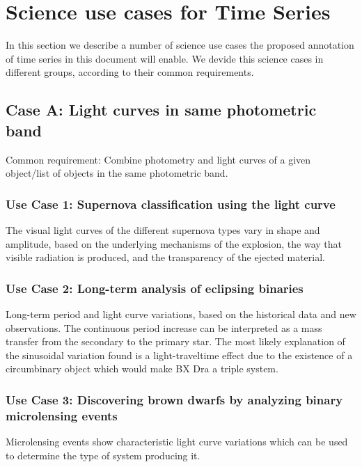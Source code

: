 \documentclass[11pt,a4paper]{ivoa}
\begin{document}
\section{Science use cases for Time Series}
In this section we describe a number of science use cases the proposed annotation of time series in this document will enable. We devide this science cases in different groups, according to their common requirements. 
\subsection{Case A: Light curves in same photometric band}
Common requirement: Combine photometry and light curves of a given object/list of objects in the same photometric band. 

\subsubsection{Use Case 1: Supernova classification using the light curve}
The visual light curves of the different supernova types vary in shape and amplitude, based on the underlying mechanisms of the explosion, the way that visible radiation is produced, and the transparency of the ejected material.
\subsubsection{Use Case 2: Long-term analysis of eclipsing binaries}
Long-term period and light curve variations, based on the historical data and new observations. The continuous period increase can be interpreted as a mass transfer from the secondary to the primary star. The most likely explanation of the sinusoidal variation found is a light-traveltime effect due to the existence of a circumbinary object which would make BX Dra a triple system.
\subsubsection{Use Case 3: Discovering brown dwarfs by analyzing binary microlensing events}
Microlensing events show characteristic light curve variations which can be used to determine the type of system producing it. %

\end{document}
